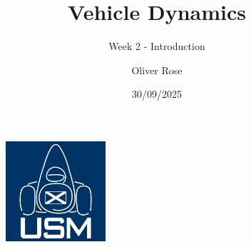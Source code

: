 \documentclass{beamer}
\title{Vehicle Dynamics}
\subtitle{Week 2 - Introduction}
\author{Oliver Rose}
\institute{University of Strathclyde Motorsport}
\date{30/09/2025}
\begin{document}
\begin{frame}
    \maketitle
\end{frame}





\begin{frame}[focus]
    \begin{figure}
        \includegraphics[width=0.33\textwidth]{../../res/usm-logo.png}
    \end{figure}
\end{frame}
\end{document}
